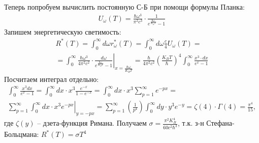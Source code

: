 	
	Теперь попробуем вычислить постоянную С-Б при помощи формулы Планка:
	\begin{gather*}
	U_\omega(T)=\frac{\hbar\omega^3}{\pi^2c^3}\cdot\frac{1}{e^{\frac{\hbar\omega}{K_BT}}-1}
	\end{gather*}
	Запишем энергетическую светимость:
	\begin{gather*}
	R^\ast(T)
	=
	\int_{0}^{\infty}d\omega r^\ast_\omega(T)
	=
	\int_{0}^{\infty}d\omega\frac{c}{4}U_\omega(T)
	=\\
	=
	\left.
	\int_{0}^{\infty}\frac{\hbar\omega^3}{4\pi^2c^2}\cdot\frac{d\omega}{e^{\frac{\hbar\omega}{K_BT}}-1}
	\right|_{x=\frac{\hbar\omega}{K_BT}}
	=
	\frac{\hbar}{4\pi^2c^2}\left(\frac{K_BT}{\hbar}\right)^4\int_{0}^{\infty}\frac{x^3\cdot dx}{e^x-1}
	\end{gather*}
	Посчитаем интеграл отдельно:
	\begin{gather*}
	\int_{0}^{\infty}\frac{x^3dx}{e^x-1}
	=
	\int_{0}^{\infty}dx\cdot x^3\frac{e^{-x}}{1-e^{-x}}
	=
	\int_{0}^{\infty}dx\cdot x^3\sum_{p=1}^{\infty}e^{-px}
	=\\
	\left.
	\sum_{p=1}^{\infty}\int_{0}^{\infty}dx\cdot x^3e^{-px}
	\right|_{y=-px}
	=
	\sum_{p=1}^{\infty}\left(\frac{1}{p^4}\right)\int_{0}^{\infty}dy\cdot y^3e^{-y}
	=
	\zeta(4)\cdot\Gamma(4)
	=
	\frac{\pi^4}{15},
	\end{gather*}
	где $\zeta(y)$ -- дзета-функция Римана.
	Получаем $\sigma=\frac{\pi^2K_B^4}{60c^2\hbar^3}$, т.к. з-н Стефана-Больцмана: $R^\ast(T)=\sigma T^4$
